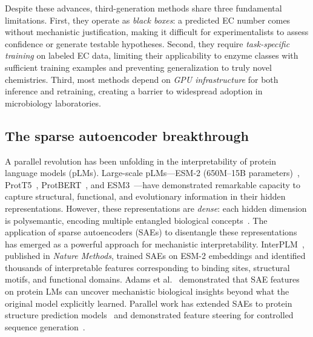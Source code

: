 \documentclass[12pt,a4paper]{article}
\begin{document}
Despite these advances, third-generation methods share three fundamental limitations. First, they operate as \textit{black boxes}: a predicted EC number comes without mechanistic justification, making it difficult for experimentalists to assess confidence or generate testable hypotheses. Second, they require \textit{task-specific training} on labeled EC data, limiting their applicability to enzyme classes with sufficient training examples and preventing generalization to truly novel chemistries. Third, most methods depend on \textit{GPU infrastructure} for both inference and retraining, creating a barrier to widespread adoption in microbiology laboratories.

\subsection{The sparse autoencoder breakthrough}

A parallel revolution has been unfolding in the interpretability of protein language models (pLMs). Large-scale pLMs---ESM-2 (650M--15B parameters)~\cite{lin2023evolutionary}, ProtT5~\cite{el2023prott5}, ProtBERT~\cite{brandes2022proteinbert}, and ESM3~\cite{rao2025esm3}---have demonstrated remarkable capacity to capture structural, functional, and evolutionary information in their hidden representations. However, these representations are \textit{dense}: each hidden dimension is polysemantic, encoding multiple entangled biological concepts~\cite{adams2025mechanistic}. The application of sparse autoencoders (SAEs) to disentangle these representations has emerged as a powerful approach for mechanistic interpretability. InterPLM~\cite{simon2025interplm}, published in \textit{Nature Methods}, trained SAEs on ESM-2 embeddings and identified thousands of interpretable features corresponding to binding sites, structural motifs, and functional domains. Adams et al.~\cite{adams2025mechanistic} demonstrated that SAE features on protein LMs can uncover mechanistic biological insights beyond what the original model explicitly learned. Parallel work has extended SAEs to protein structure prediction models~\cite{parsan2025towards} and demonstrated feature steering for controlled sequence generation~\cite{valentin2025interpreting}.
\end{document}
